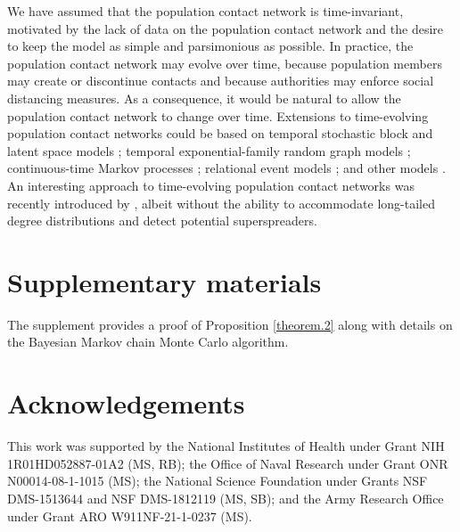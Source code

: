 \documentclass[12pt,usenatbib,referee]{article}
\renewcommand{\alert}{\textcolor{black}}
\begin{document}
We have assumed that the population contact network is time-invariant,
motivated by the lack of data on the population contact network and the desire to keep the model as simple and parsimonious as possible.
In practice,
the population contact network may evolve over time,
because population members may create or discontinue contacts and because authorities may enforce social distancing measures.
As a consequence,
it would be natural to allow the population contact network to change over time.
Extensions to time-evolving population contact networks could be based on temporal stochastic block and latent space models \citep*[e.g.,][]{FuSoXi10,sewell2015latent,sewell2016latent,sewell2016model};
temporal exponential-family random graph models \citep*{RoPa01,HaFuXi10,ouzienko2011decoupled,KrHa10};
continuous-time Markov processes \citep{Sn01a};
relational event models \citep{Bu08};
and other models \citep[e.g.,][]{KaPr59,DuDu14,sewell2017network}.
An interesting approach to time-evolving population contact networks was recently introduced by \citet{Buetal21},
albeit without the ability to accommodate long-tailed degree distributions and detect potential superspreaders.


\section*{Supplementary materials}

The supplement provides a proof of Proposition \ref{theorem.2} along with details on the Bayesian Markov chain Monte Carlo algorithm.

\section*{Acknowledgements}

This work was supported by the National Institutes of Health under Grant NIH 1R01HD052887-01A2 (MS, RB);
the Office of Naval Research under Grant ONR N00014-08-1-1015 (MS);
the National Science Foundation under Grants NSF DMS-1513644 and NSF DMS-1812119 (MS, SB);
and the Army Research Office under Grant ARO W911NF-21-1-0237 (MS).
\end{document}
